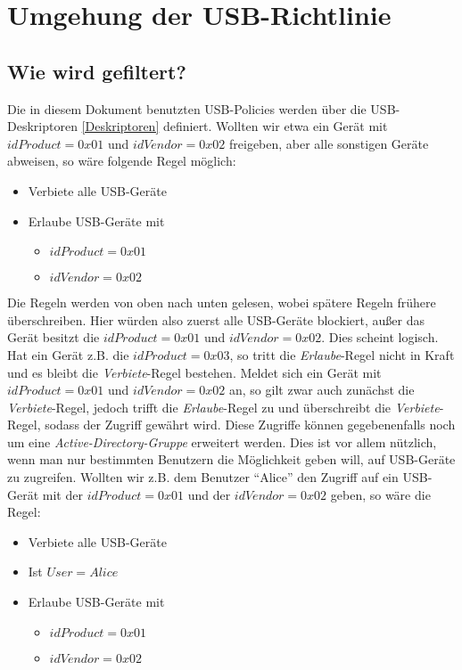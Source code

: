 \chapter{Umgehung der USB-Richtlinie}\label{Angriff}

\section{Wie wird gefiltert?}
Die in diesem Dokument benutzten USB-Policies werden über die USB-Deskriptoren \ref{Deskriptoren} definiert. Wollten wir etwa ein Gerät mit $idProduct=0x01$ und $idVendor=0x02$ freigeben, aber alle sonstigen Geräte abweisen, so wäre folgende Regel möglich:
			\begin{itemize}
				\item Verbiete alle USB-Geräte
				\item Erlaube USB-Geräte mit
				\begin{itemize}
					\item $idProduct=0x01$
					\item $idVendor=0x02$
				\end{itemize}
			\end{itemize}
Die Regeln werden von oben nach unten gelesen, wobei spätere Regeln frühere überschreiben. Hier würden also zuerst alle USB-Geräte blockiert, außer das Gerät besitzt die $idProduct=0x01$ und $idVendor=0x02$. Dies scheint logisch. Hat ein Gerät z.B. die $idProduct=0x03$, so tritt die \textit{Erlaube}-Regel nicht in Kraft und es bleibt die \textit{Verbiete}-Regel bestehen. Meldet sich ein Gerät mit $idProduct=0x01$ und $idVendor=0x02$ an, so gilt zwar auch zunächst die \textit{Verbiete}-Regel, jedoch trifft die \textit{Erlaube}-Regel zu und überschreibt die \textit{Verbiete}-Regel, sodass der Zugriff gewährt wird.
Diese Zugriffe können gegebenenfalls noch um eine \textit{Active-Directory-Gruppe} erweitert werden. Dies ist vor allem nützlich, wenn man nur bestimmten Benutzern die Möglichkeit geben will, auf USB-Geräte zu zugreifen. Wollten wir z.B. dem Benutzer "`Alice"' den Zugriff auf ein USB-Gerät mit der $idProduct=0x01$ und der $idVendor=0x02$ geben, so wäre die Regel:
			\begin{itemize}
				\item Verbiete alle USB-Geräte
				\item Ist $User=Alice$
				\item Erlaube USB-Geräte mit
				\begin{itemize}
					\item $idProduct=0x01$
					\item $idVendor=0x02$
				\end{itemize} 
			\end{itemize}

